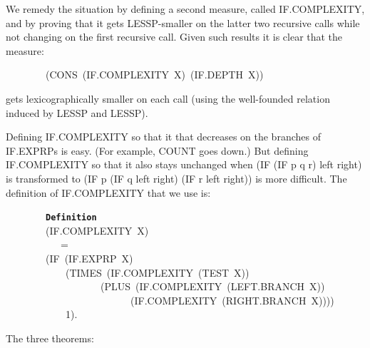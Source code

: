 \documentclass[11pt]{book}
\newenvironment{pubasis}{\begin{flushleft}\ttfamily\small}{\normalsize\rmfamily\end{flushleft}}
\newcommand{\axiomordefinition}[1]{\vspace{6pt}\texttt{\textbf{#1}}}
\begin{document}
We remedy the situation by defining a second measure, called IF.COM\-PLEX\-I\-TY,
and by proving that it gets LESSP-smaller on the latter two recursive
calls while not changing on the first recursive call.  Given such results
it is clear that the measure:
\begin{pubasis}
~~~~~~~~(CONS~(IF.COM\-PLEX\-I\-TY~X)~(IF.DEPTH~X))\\
\end{pubasis}
gets lexicographically smaller on each call (using the well-founded
relation induced by LESSP and LESSP).

Defining IF.COM\-PLEX\-I\-TY so that it that decreases on the branches of IF.EXPRPs is easy.
(For example, COUNT goes down.)  But defining IF.COM\-PLEX\-I\-TY so that it also stays
unchanged when (IF (IF p q r) left right) is transformed to
(IF p (IF q left right) (IF r left right)) is more difficult.  The
definition of IF.COM\-PLEX\-I\-TY that we use is:
\begin{pubasis}
~~~~~~~~\axiomordefinition{Definition}\\
~~~~~~~~(IF.COM\-PLEX\-I\-TY~X)\\
~~~~~~~~~~~=\\
~~~~~~~~(IF~(IF.EXPRP~X)\\
~~~~~~~~~~~~(TIMES~(IF.COM\-PLEX\-I\-TY~(TEST~X))\\
~~~~~~~~~~~~~~~~~~~(PLUS~(IF.COM\-PLEX\-I\-TY~(LEFT.BRANCH~X))\\
~~~~~~~~~~~~~~~~~~~~~~~~~(IF.COM\-PLEX\-I\-TY~(RIGHT.BRANCH~X))))\\
~~~~~~~~~~~~1).\\
\end{pubasis}
The three theorems:
\end{document}
